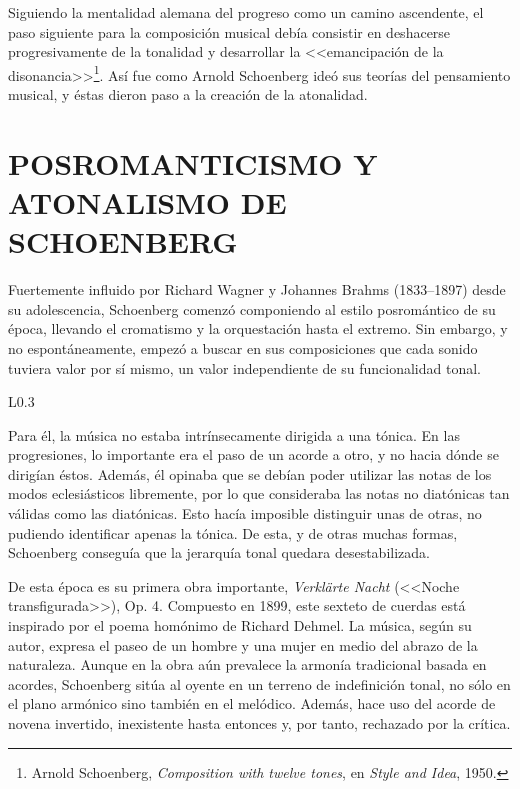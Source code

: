 		Siguiendo la mentalidad alemana del progreso como un camino ascendente, el paso siguiente para la composición musical debía consistir en deshacerse progresivamente de la tonalidad y desarrollar la <<emancipación de la disonancia>>\footnote{Arnold Schoenberg, \emph{Composition with twelve tones}, en \emph{Style and Idea}, 1950.}. Así fue como Arnold Schoenberg ideó sus teorías del pensamiento musical, y éstas dieron paso a la creación de la atonalidad. \cite{kinney}
	
	\section{POSROMANTICISMO Y ATONALISMO DE SCHOENBERG}
		Fuertemente influido por Richard Wagner y Johannes Brahms (1833--1897) desde su adolescencia, Schoenberg comenzó componiendo al estilo posromántico de su época, llevando el cromatismo y la orquestación hasta el extremo. Sin embargo, y no espontáneamente, empezó a buscar en sus composiciones que cada sonido tuviera valor por sí mismo, un valor independiente de su funcionalidad tonal. 
		
		\begin{wrapfigure}{L}{0.3\textwidth}
			\captionsetup{justification=centering, font=footnotesize}
			\vspace{-0.5cm}
		\end{wrapfigure}
		Para él, la música no estaba intrínsecamente dirigida a una tónica. En las progresiones, lo importante era el paso de un acorde a otro, y no hacia dónde se dirigían éstos. Además, él opinaba que se debían poder utilizar las notas de los modos eclesiásticos libremente, por lo que consideraba las notas no diatónicas tan válidas como las diatónicas. Esto hacía imposible distinguir unas de otras, no pudiendo identificar apenas la tónica. De esta, y de otras muchas formas, Schoenberg conseguía que la jerarquía tonal quedara desestabilizada. \cite{kinney}
		
		De esta época es su primera obra importante, \emph{Verklärte Nacht} (<<Noche transfigurada>>), Op. 4. Compuesto en 1899, este sexteto de cuerdas está inspirado por el poema homónimo de Richard Dehmel. La música, según su autor, expresa el paseo de un hombre y una mujer en medio del abrazo de la naturaleza.  Aunque en la obra aún prevalece la armonía tradicional basada en acordes, Schoenberg sitúa al oyente en un terreno de indefinición tonal, no sólo en el plano armónico sino también en el melódico. Además, hace uso del acorde de novena invertido, inexistente hasta entonces y, por tanto, rechazado por la crítica. \cite{diaz}
				
